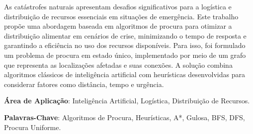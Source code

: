 \documentclass[a4paper,12pt]{scrreprt}
\begin{document}




\makecover






\renewenvironment{abstract}
 {\par\noindent\textbf{\Large\abstractname}\par\bigskip}
 {}

\begin{flushleft}
\begin{abstract}
    As catástrofes naturais apresentam desafios significativos para a logística e distribuição
    de recursos essenciais em situações de emergência. 
    Este trabalho propõe uma abordagem baseada em algoritmos de procura para otimizar a distribuição
    alimentar em cenários de crise, minimizando o tempo de resposta e garantindo a eficiência no uso
    dos recursos disponíveis. Para isso, foi formulado um problema de procura em estado único, implementado
    por meio de um grafo que representa as localizações afetadas e suas conexões. A solução combina algoritmos
    clássicos de inteligência artificial com heurísticas desenvolvidas para considerar fatores como distância,
    tempo e urgência.
    \par \textbf{Área de Aplicação}: Inteligência Artificial, Logística, Distribuição de Recursos.
    \par \textbf{Palavras-Chave}: Algoritmos de Procura, Heurísticas, A*, Gulosa, BFS, DFS, Procura Uniforme.
\end{abstract}
\end{flushleft}

\pagebreak



\end{document}
